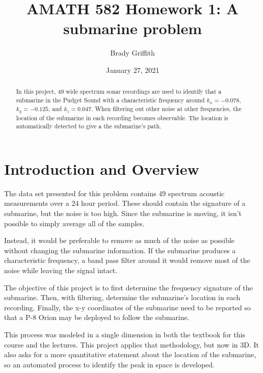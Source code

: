 \documentclass{article}
\title{AMATH 582 Homework 1: A submarine problem}
\author{Brady Griffith}
\date{January 27, 2021}
\begin{document}
    \maketitle

    \begin{abstract}
        In this project, 49 wide spectrum sonar recordings are used to identify that a submarine in the Pudget Sound with a characteristic frequency around $k_x=-0.078$, $k_y=-0.125$, and $k_z = 0.047$. When filtering out other noise at other frequencies, the location of the submarine in each recording becomes observable. The location is automatically detected to give a the submarine's path.
    \end{abstract}

    \section{Introduction and Overview}
    The data set presented for this problem contains 49 spectrum acoustic measurements over a 24 hour period. These should contain the signature of a submarine, but the noise is too high. Since the submarine is moving, it isn't possible to simply average all of the samples.

    Instead, it would be preferable to remove as much of the noise as possible without changing the submarine information. If the submarine produces a characteristic frequency, a band pass filter around it would remove most of the noise while leaving the signal intact.

    The objective of this project is to first determine the frequency signature of the submarine. Then, with filtering, determine the submarine's location in each recording. Finally, the x-y coordinates of the submarine need to be reported so that a P-8 Orion may be deployed to follow the submarine.
    
    This process was modeled in a single dimension in both the textbook for this course \cite{kutz_2013} and the lectures. This project applies that methodology, but now in 3D. It also asks for a more quantitative statement about the location of the submarine, so an automated process to identify the peak in space is developed.
\end{document}
